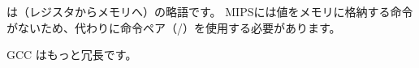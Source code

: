 
は（レジスタからメモリへ）の略語です。 
MIPSには値をメモリに格納する命令がないため、代わりに命令ペア（/）を使用する必要があります。






\NonOptimizing GCC はもっと冗長です。





